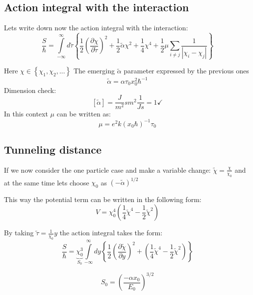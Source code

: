 \documentclass[12pt,a4paper]{article}
\numberwithin{equation}{section}
\begin{document}
\subsection{Action integral with the interaction}
Lets write down now the action integral with the interaction:
\begin{equation}
\frac{S}{\hbar} = \int\limits_{-\infty}^\infty d\tilde{\tau} \left\lbrace\frac{1}{2} \left(\frac{\partial \chi}{\partial \tilde{\tau}}\right)^2 + \frac{1}{2} \tilde{\alpha} \chi^2 + \frac{1}{4} \chi^4 + \frac{1}{2} \mu \sum\limits_{i \neq j} \frac{1}{|\chi_i - \chi_j|}\right\rbrace
\end{equation}

Here $\chi \in \left\lbrace\chi_1, \chi_2, ...\right\rbrace$
The emerging $\tilde{\alpha}$ parameter expressed by the previous ones
\begin{equation}
\tilde{\alpha} = \alpha \tau_0 x_0^2 \hbar^{-1}
\end{equation}
Dimension check:
\[
[\tilde{\alpha}] = \frac{J}{m^2} s m^2 \frac{1}{J s} = 1 \checkmark
\]
In this context $\mu$ can be written as:
\begin{equation}
\mu = e^2 k (x_0 \hbar)^{-1} \tau_0
\end{equation}

\subsection{Tunneling distance}
If we now consider the one particle case and make a variable change: $\tilde{\chi} = \frac{\chi}{\chi_0}$ and at the same time lets choose $\chi_0$ as $(-\tilde{\alpha})^{1/2}$

This way the potential term can be written in the following form:
\begin{equation}
V = \chi_0 ^4 \left( \frac{1}{4} \tilde{\chi}^4 - \frac{1}{2} \tilde{\chi}^2\right)
\end{equation}

By taking $\tilde{\tau} = \frac{1}{\chi_0}y $ the action integral takes the form:
\begin{equation}\label{eq16}
\frac{S}{\hbar} = \underbrace{\chi_0^3}_{S_0} \int\limits_{-\infty}^\infty dy \left\lbrace \frac{1}{2} \left( \frac{\partial \tilde{\chi}}{\partial y} \right)^2 + \left( \frac{1}{4} \tilde{\chi}^4 - \frac{1}{2} \tilde{\chi}^2\right) \right\rbrace
\end{equation}

\begin{equation}
S_0 = \left( \frac{-\alpha x_0}{E_0} \right)^{3/2}
\end{equation}
\end{document}
